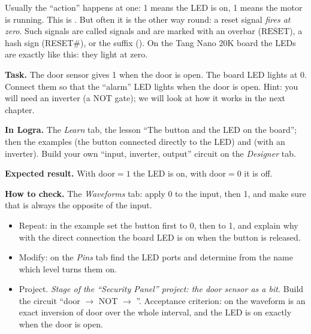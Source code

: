 \begin{infobox}
Usually the ``action'' happens at one: 1 means the LED is on, 1 means the
motor is running. This is . But often it is the other way
round: a reset signal \emph{fires at zero}. Such signals are called
 signals and are marked with an overbar
($\overline{\text{RESET}}$), a hash sign (RESET\#), or the suffix 
(). On the Tang Nano 20K board the LEDs are exactly like this:
they light at zero.
\end{infobox}

\begin{diybox}
\textbf{Task.} The door sensor gives 1 when the door is open. The board LED
lights at 0. Connect them so that the ``alarm'' LED lights when the door is
open. Hint: you will need an inverter (a NOT gate); we will look at how it
works in the next chapter.\par
\textbf{In Logra.} The \emph{Learn} tab, the lesson ``The button and the LED
on the board''; then the examples  (the button connected
directly to the LED) and  (with an inverter). Build your own
``input, inverter, output'' circuit on the \emph{Designer} tab.\par
\textbf{Expected result.} With door${}=1$ the LED is on, with
door${}=0$ it is off.\par
\textbf{How to check.} The \emph{Waveforms} tab: apply 0 to the input, then
1, and make sure that  is always the opposite of the input.
\begin{itemize}[leftmargin=3.4em,labelwidth=3em,labelsep=0.4em,align=left]
  \item[\stars{1}] Repeat: in the  example set the button first
    to 0, then to 1, and explain why with the direct connection the board LED
    is on when the button is released.
  \item[\stars{2}] Modify: on the \emph{Pins} tab find the LED ports and
    determine from the name  which level turns them on.
  \item[\stars{3}] Project. \emph{Stage of the ``Security Panel'' project: the
    door sensor as a bit.} Build the circuit ``door $\to$ NOT $\to$
    ''. Acceptance criterion: on the waveform  is an
    exact inversion of door over the whole interval, and the LED is on exactly
    when the door is open.
\end{itemize}
\end{diybox}

